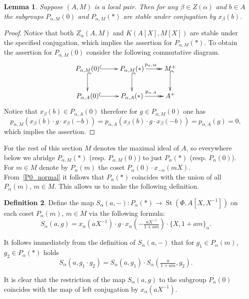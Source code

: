 \documentclass[oneside, 8pt]{amsart}
\newtheorem{lemma}{Lemma}
\theoremstyle{remark}
\theoremstyle{definition}
\newtheorem{df}[lemma]{Definition} \Crefname{df}{Definition}{Definitions}
\DeclareMathOperator{\St}{St}
\numberwithin{equation}{section}
\begin{document}
\begin{lemma} \label{P0-conj-invariant} Suppose $(A, M)$ is a local pair. Then for any $\beta \in Z(\alpha)$ and $b \in A$ the subgroups $P_{\alpha, M}(0)$ and $P_{\alpha, M}(*)$ are stable under conjugation by $x_\beta(b)$. \end{lemma}
\begin{proof}
Notice that both $Z_\alpha(A, M)$ and $K(A[X], M[X])$ are stable under the specified conjugation, which implies the assertion for $P_{\alpha, M}(*)$. 
To obtain the assertion for $P_{\alpha, M}(0)$ consider the following commutative diagram. \[ \xymatrix{ P_{\alpha, M}(0) \ar@{^{(}->}[r] \ar@{^{(}->}[d] & P_{\alpha, M}(*) \ar@{->>}[r]^{p_{\alpha, M}} \ar@{^{(}->}[d] & M^+ \ar@{^{(}->}[d] \\ P_{\alpha, A}(0) \ar@{^{(}->}[r] & P_{\alpha, A}(*) \ar@{->>}[r]^{p_{\alpha, A}} & A^+} \]
Notice that $x_\beta(b) \in P_{\alpha, A}(0)$ therefore for $g \in P_{\alpha, M}(0)$ one has \[p_{\alpha, M}(x_\beta(b) \cdot g \cdot x_\beta(-b)) = p_{\alpha, A}(x_\beta(b) \cdot g \cdot x_\beta(-b)) = p_{\alpha, A}(g) = 0,\] which implies the assertion.\end{proof}

For the rest of this section $M$ denotes the maximal ideal of $A$, so everywhere below we abridge $P_{\alpha, M}(*)$ (resp. $P_{\alpha, M}(0)$) to just $P_{\alpha}(*)$ (resp. $P_{\alpha}(0)$). For $m \in M$ denote by $P_\alpha(m)$ the coset $P_\alpha(0) \cdot x_{-\alpha}(mX)$.
From~\cref{P0_normal} it follows that $P_\alpha(*)$ coincides with the union of all $P_\alpha(m)$, $m\in M$. This allows us to make the following definition. 

\begin{df} Define the map $S_\alpha(a, -) \colon P_\alpha(*) \to \St(\Phi, A[X, X^{-1}])$ on each coset $P_\alpha(m)$, $m \in M$ via the following formula:
\[ S_\alpha(a, g) = x_\alpha(aX^{-1})\cdot g \cdot x_\alpha\left(-\tfrac{aX^{-1}}{1 + am}\right) \cdot \{X, 1+ am\}_\alpha.\] \end{df}
It follows immediately from the definition of $S_\alpha(a, -)$ that for $g_1 \in P_\alpha(m)$, $g_2 \in P_\alpha(*)$ holds
\begin{equation} \label{eq:Smult} S_\alpha(a, g_1\cdot g_2) = S_\alpha(a, g_1) \cdot S_\alpha\left(\tfrac{a}{1+am}, g_2\right).\end{equation}

It is clear that the restriction of the map $S_\alpha(a, g)$ to the subgroup $P_\alpha(0)$ coincides with the map of left conjugation by $x_\alpha(aX^{-1})$.
\end{document}
